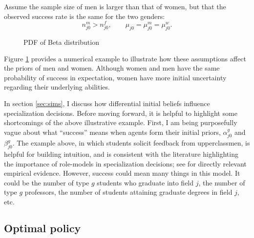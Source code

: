 Assume the sample size of men is larger than that of women, but that the observed success rate is the same for the two genders:
\begin{equation*}
  n_{j0}^m > n_{j0}^f, \quad \quad \mu_{j0} = \mu_{j0}^m = \mu_{j0}^w.
\end{equation*}
\begin{figure}
\centering

\caption{PDF of Beta distribution}
\label{beta_distribution}
\end{figure}
Figure \ref{beta_distribution} provides a numerical example to illustrate how these assumptions affect the priors of men and women. 
Although women and men have the same probability of success in expectation, women have more initial uncertainty regarding their underlying abilities. 

In section \ref{sec:sims}, I discuss how differential initial beliefs influence specialization decisions.
Before moving forward, it is helpful to highlight some shortcomings of the above illustrative example.
First, I am being purposefully vague about what ``success'' means when agents form their initial priors, $\alpha_{j0}^g$ and $\beta_{j0}^g$.
The example above, in which students solicit feedback from upperclassmen, is helpful for building intuition, and is consistent with the literature highlighting the importance of role-models in specialization decisions; see \textcite{PS20} for directly relevant empirical evidence.
However, success could mean many things in this model. 
It could be the number of type $g$ students who graduate into field $j$, the number of type $g$ professors, the number of students attaining graduate degrees in field $j$, etc. 


\subsection{Optimal policy}\label{sec:optimal_policy}

